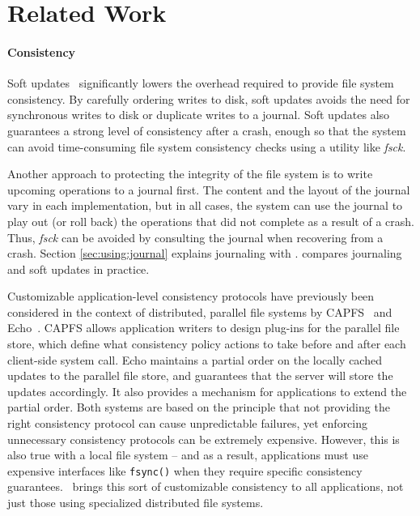 \section{Related Work}
\label{sec:related}

\paragraph{Consistency}

Soft updates~\cite{ganger00soft} 
significantly lowers the overhead required to provide file system
consistency. By carefully ordering writes to disk, soft updates avoids the need
for synchronous writes to disk or duplicate writes to a journal. Soft updates
also guarantees a strong level of consistency after a crash, enough so that the
system can avoid time-consuming file system consistency checks using a utility
like \emph{fsck}. 


Another approach to protecting the integrity of the file system is to write
upcoming operations to a journal first. The content and the layout of the
journal vary in each implementation, but in all cases, the system can use
the journal to play out (or roll back) the operations that did not complete
as a result of a crash. Thus, \emph{fsck} can be avoided by consulting the
journal when recovering from a crash. Section \ref{sec:using:journal}
explains journaling with \chdescs. \cite{seltzer00journaling} compares
journaling and soft updates in practice.

\cite{nightingale06rethink}
\cite{sivathanu05ensuring}

Customizable application-level consistency protocols have previously been
considered in the context of distributed, parallel file systems by
CAPFS~\cite{vilayannur05providing} and Echo~\cite{mann94coherent}.
%
CAPFS allows application writers to design plug-ins for the parallel file
store, which define what consistency policy actions to take before and after
each client-side system call.
%
Echo maintains a partial order on the locally cached updates to the parallel
file store, and guarantees that the server will store the updates accordingly.
It also provides a mechanism for applications to extend the partial order.
%
Both systems are based on the principle that not providing the right
consistency protocol can cause unpredictable failures, yet enforcing
unnecessary consistency protocols can be extremely expensive.
%
However, this is also true with a local file system -- and as a result,
applications must use expensive interfaces like \texttt{fsync()} when they
require specific consistency guarantees.
%
\Kudos\ brings this sort of customizable consistency to all applications, not
just those using specialized distributed file systems.

